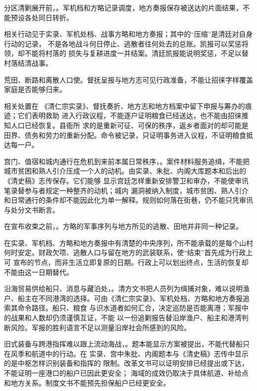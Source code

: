 分区清剿展开前，。军机档和方略记录调度，地方奏报保存被送达的片面结果，不能预设各处同日转折。


相关行动见于实录、军机处档、战事方略和地方奏报；其中的“压缩”是清廷对自身行动的记录，
不是各地战斗何日停止、逃散者往何处去的总账。凯报可以奖惩将领，却不能将村落的
损失与复耕进度一并结案。清廷凯报能说明奖惩，不足以替村落结清战事。

荒田、断路和离散人口使。督抚呈报与地方志可见行政准备，不能让招徕字样覆盖家庭是否能够归来。

相关处置在
《清仁宗实录》、督抚奏折、地方志和地方档案中留下申报与筹办的痕迹；它们表明救助
进入行政议程，不能逐户证明粮食已经送达，也不能由招徕推知人口已经恢复。县衙所
求的是重新可征、可保的秩序，返乡者面对的却可能是田界、债务和劳力的重新分配。命令被记录，只证明事务进入议程，不证明粮食抵达每一户。

宫门、值宿和城内通行在危机到来前本属日常秩序，。案件材料服务追缉，不能把城市贫困和熟人引介压成一个人的动机。由实录、朱批、内阁大库题本和后出的《清史稿》志传保存。它们能够
显示宫廷怎样重新安排警卫和审办，不能使审讯笔录替参与者规定一种整齐的动机；城内
漏洞被纳入制度，城市贫困、熟人引介和日常通行的条件却不能因此化为单一解释。规则如何落在街巷，仍不能只凭审讯与处分文书断言。

在宣布收束之前，。方略的军事序列与地方所见的逃散、田地并非同一种记录。

在实录、军机档、方略和地方奏报中有清楚的中央序列，所不能承载的是每个山村
何时安定。财政欠项、逃散人口与留在地方的武装联系，使“结束”首先成为行政上可
宣布的节点，而非生活立即复原的日期。行政上可以划出终点，生活的恢复却不能由这一日期替代。

沿海贸易供给船只、消息与藏泊处，。清方文书把人员列为缉捕对象，难以说明渔户、船主在不同港湾的选择。可由《清仁宗实录》、军机处档、方略和地方奏报追索其命令路径。船只、粮食
与识水道者如何汇合，决定巡防是否能离港；军报中的战果和人数却仍须谨慎互证，不能
以一份追剿报告替沿岸渔户、船主和港湾判断风险。军报的胜利语言不足以测量沿岸社会所感到的风险。

旧式装备与跨港指挥难以跟上流动海战，。题本能显示方案被提出，不能代替船只在风季和航道中的行动。在
实录、宫中朱批、内阁题本与《清史稿》志传中显示的是中枢怎样识别装备和指挥的
限制。改革文书可以证明安排已经提出或下达，不能证明一座港口的船户已因此更安全；
海域的成效仍取决于具体航道、补给点和地方关系。制度文书不能预先担保船户已经更安全。

